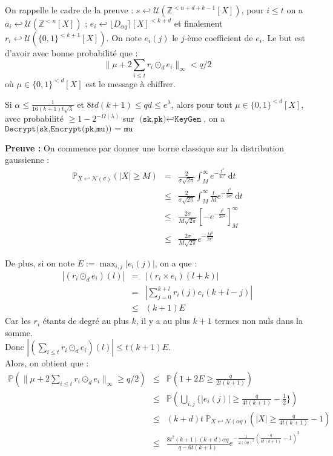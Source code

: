 \documentclass[11pt,a4paper]{article}
\begin{document}
On rappelle le cadre de la preuve : $s \hookleftarrow \mathcal{U}(\mathbb{Z}^{<n+d+k-1}[X])$, pour $i\leq t$ on a $a_i \hookleftarrow \mathcal{U}(\mathbb{Z}^{<n}[X])$ ; $e_i \hookleftarrow \lfloor D_{\alpha q}\rceil[X]^{<k+d}$ et finalement $r_i \hookleftarrow \mathcal{U}(\{0,1\}^{<k+1}[X])$. On note $e_i(j)$ le $j$-ème coefficient de $e_i$. Le but est d'avoir avec bonne probabilité que : 
\[\|\mu + 2\sum_{i \leq t}r_i \odot_d e_i  \|_\infty < q/2 \] où $\mu \in \{0,1\}^{<d}[X]$ est le message à chiffrer. 
\begin{theorem}
Si $\alpha \leq \frac{1}{16(k+1)t\sqrt{\lambda}}$ et  $8td(k+1)\leq qd\leq e^\lambda$, alors pour tout $\mu \in \{0,1\}^{<d}[X]$, avec probabilité $\geq 1 - 2^{-\Omega(\lambda)}$ sur $\texttt{(sk,pk)}\hookleftarrow\texttt{KeyGen} $, on a $\texttt{Decrypt(sk,Encrypt(pk,mu)) = mu}$ 
\end{theorem}
\textbf{Preuve :}
On commence par donner une borne classique sur la distribution gaussienne : 
\begin{eqnarray*}
\mathbb{P}_{X \hookleftarrow \mathcal{N}(\sigma)}(|X| \geq M) &=& \frac{2}{\sigma \sqrt{2 \pi}} \int_{M}^\infty e^{-\frac{t^2}{2 \sigma^2}} \, \mathrm{d}t \\
&\leq &  \frac{2}{\sigma \sqrt{2 \pi}}\int_{M}^\infty \frac{t}{M} e^{-\frac{t^2}{2 \sigma^2}} \, \mathrm{d}t \\
& \leq & \frac{2\sigma}{M \sqrt{2 \pi}} [-e^{-\frac{t^2}{2 \sigma^2}}]_M^\infty \\
& \leq & \frac{2\sigma}{M \sqrt{2 \pi}} e^{-\frac{M^2}{2 \sigma^2}}
\end{eqnarray*}


De plus, si on note $E := \max_{i,j} |e_i(j)|$, on a que :  \\
\begin{eqnarray*}
|(r_i \odot_d e_i)(l)| &=& |(r_i\times e_i)(l+k)| \\
&=& |\sum_{j=0}^{k+l}r_i(j)e_i(k+l-j)| \\
&\leq& (k+1)E
\end{eqnarray*}
Car les $r_i$ étants de degré au plus $k$, il y a au plus $k+1$ termes non nuls dans la somme.\\

Donc $|(\sum_{i \leq t}r_i \odot_d e_i)(l)|\leq t(k+1)E$. \\

Alors, on obtient que : 
\begin{eqnarray*}
\mathbb{P}(\|\mu + 2\sum_{i \leq t}r_i \odot_d e_i  \|_\infty \geq q/2 ) &\leq& \mathbb{P}(1+2E \geq \frac{q}{2t(k+1)}) \\
&\leq& \mathbb{P}(\bigcup_{i,j} \{ |e_i(j)| \geq \frac{q}{4t(k+1)} - \frac{1}{2} \} ) \\
&\leq& (k+d)t \ \mathbb{P}_{X \hookleftarrow \mathcal{N}(\alpha q)}(|X| \geq \frac{q}{4t(k+1)} - 1) \\
&\leq& \frac{8t^2(k+1)(k+d)\alpha q}{q - 6t(k+1)} e^{-\frac{1}{2(\alpha q)^2}(\frac{q}{4t(k+1)}-1)^2} \\
\end{eqnarray*}
\end{document}
